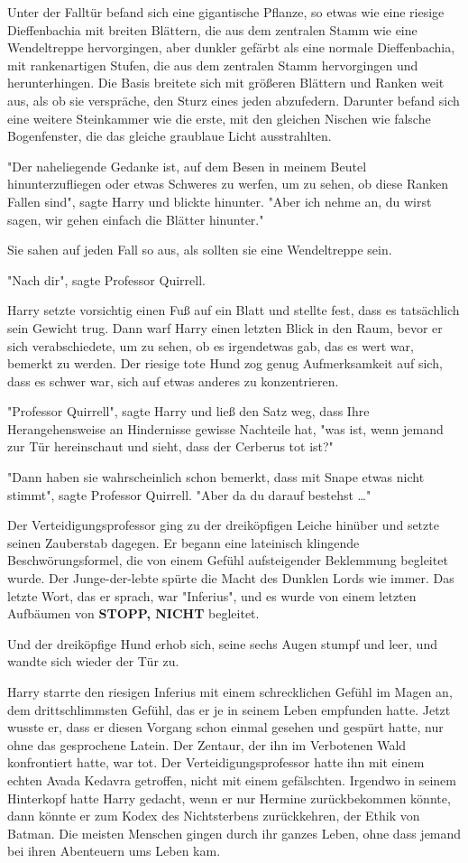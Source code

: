 {Unter der Falltür befand sich eine gigantische Pflanze, so etwas wie eine riesige Dieffenbachia mit breiten Blättern, die aus dem zentralen Stamm wie eine Wendeltreppe hervorgingen, aber dunkler gefärbt als eine normale Dieffenbachia, mit rankenartigen Stufen, die aus dem zentralen Stamm hervorgingen und herunterhingen. Die Basis breitete sich mit größeren Blättern und Ranken weit aus, als ob sie verspräche, den Sturz eines jeden abzufedern. Darunter befand sich eine weitere Steinkammer wie die erste, mit den gleichen Nischen wie falsche Bogenfenster, die das gleiche graublaue Licht ausstrahlten.

"Der naheliegende Gedanke ist, auf dem Besen in meinem Beutel hinunterzufliegen oder etwas Schweres zu werfen, um zu sehen, ob diese Ranken Fallen sind", sagte Harry und blickte hinunter. "Aber ich nehme an, du wirst sagen, wir gehen einfach die Blätter hinunter."

Sie sahen auf jeden Fall so aus, als sollten sie eine Wendeltreppe sein.

"Nach dir", sagte Professor Quirrell.

Harry setzte vorsichtig einen Fuß auf ein Blatt und stellte fest, dass es tatsächlich sein Gewicht trug. Dann warf Harry einen letzten Blick in den Raum, bevor er sich verabschiedete, um zu sehen, ob es irgendetwas gab, das es wert war, bemerkt zu werden. Der riesige tote Hund zog genug Aufmerksamkeit auf sich, dass es schwer war, sich auf etwas anderes zu konzentrieren.

"Professor Quirrell", sagte Harry und ließ den Satz weg, dass Ihre Herangehensweise an Hindernisse gewisse Nachteile hat, "was ist, wenn jemand zur Tür hereinschaut und sieht, dass der Cerberus tot ist?"

"Dann haben sie wahrscheinlich schon bemerkt, dass mit Snape etwas nicht stimmt", sagte Professor Quirrell. "Aber da du darauf bestehst …"

Der Verteidigungsprofessor ging zu der dreiköpfigen Leiche hinüber und setzte seinen Zauberstab dagegen. Er begann eine lateinisch klingende Beschwörungsformel, die von einem Gefühl aufsteigender Beklemmung begleitet wurde. Der Junge-der-lebte spürte die Macht des Dunklen Lords wie immer. Das letzte Wort, das er sprach, war "Inferius", und es wurde von einem letzten Aufbäumen von \textbf{STOPP, NICHT} begleitet.

Und der dreiköpfige Hund erhob sich, seine sechs Augen stumpf und leer, und wandte sich wieder der Tür zu.

Harry starrte den riesigen Inferius mit einem schrecklichen Gefühl im Magen an, dem drittschlimmsten Gefühl, das er je in seinem Leben empfunden hatte. Jetzt wusste er, dass er diesen Vorgang schon einmal gesehen und gespürt hatte, nur ohne das gesprochene Latein. Der Zentaur, der ihn im Verbotenen Wald konfrontiert hatte, war tot. Der Verteidigungsprofessor hatte ihn mit einem echten Avada Kedavra getroffen, nicht mit einem gefälschten. Irgendwo in seinem Hinterkopf hatte Harry gedacht, wenn er nur Hermine zurückbekommen könnte, dann könnte er zum Kodex des Nichtsterbens zurückkehren, der Ethik von Batman. Die meisten Menschen gingen durch ihr ganzes Leben, ohne dass jemand bei ihren Abenteuern ums Leben kam.

}
